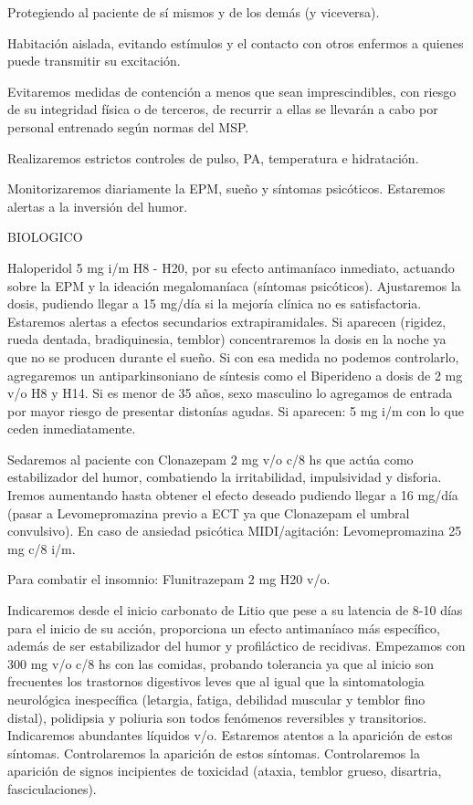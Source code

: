 Protegiendo al paciente de sí mismos y de los demás (y viceversa).

Habitación aislada, evitando estímulos y el contacto con otros enfermos a quienes puede transmitir su excitación.

Evitaremos medidas de contención a menos que sean imprescindibles, con riesgo de su integridad física o de terceros, de recurrir a ellas se llevarán a cabo por personal entrenado según normas del MSP.

Realizaremos estrictos controles de pulso, PA, temperatura e hidratación.

Monitorizaremos diariamente la EPM, sueño y síntomas psicóticos. Estaremos alertas a la inversión del humor.

BIOLOGICO

Haloperidol 5 mg i/m H8 - H20, por su efecto antimaníaco inmediato, actuando sobre la EPM y la ideación megalomaníaca (síntomas psicóticos). Ajustaremos la dosis, pudiendo llegar a 15 mg/día si la mejoría clínica no es satisfactoria. Estaremos alertas a efectos secundarios extrapiramidales. Si aparecen (rigidez, rueda dentada, bradiquinesia, temblor) concentraremos la dosis en la noche ya que no se producen durante el sueño. Si con esa medida no podemos controlarlo, agregaremos un antiparkinsoniano de síntesis como el Biperideno a dosis de 2 mg v/o H8 y H14. Si es menor de 35 años, sexo masculino lo agregamos de entrada por mayor riesgo de presentar distonías agudas. Si aparecen: 5 mg i/m con lo que ceden inmediatamente.

Sedaremos al paciente con Clonazepam 2 mg v/o c/8 hs que actúa como estabilizador del humor, combatiendo la irritabilidad, impulsividad y disforia. Iremos aumentando hasta obtener el efecto deseado pudiendo llegar a 16 mg/día (pasar a Levomepromazina previo a ECT ya que Clonazepam el umbral convulsivo). En caso de ansiedad psicótica MIDI/agitación: Levomepromazina 25 mg c/8 i/m.

Para combatir el insomnio: Flunitrazepam 2 mg H20 v/o.

Indicaremos desde el inicio carbonato de Litio que pese a su latencia de 8-10 días para el inicio de su acción, proporciona un efecto antimaníaco más específico, además de ser estabilizador del humor y profiláctico de recidivas. Empezamos con 300 mg v/o c/8 hs con las comidas, probando tolerancia ya que al inicio son frecuentes los trastornos digestivos leves que al igual que la sintomatologia neurológica inespecífica (letargia, fatiga, debilidad muscular y temblor fino distal), polidipsia y poliuria son todos fenómenos reversibles y transitorios. Indicaremos abundantes líquidos v/o. Estaremos atentos a la aparición de estos síntomas. Controlaremos la aparición de estos síntomas. Controlaremos la aparición de signos incipientes de toxicidad (ataxia, temblor grueso, disartria, fasciculaciones).


